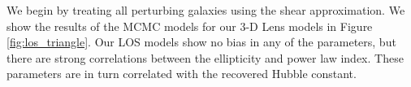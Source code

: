We begin by treating all perturbing galaxies using the shear approximation. We show the results of the MCMC models for our 3-D Lens models in Figure \ref{fig:los_triangle}. Our LOS models show no bias in any of the parameters, but there are strong correlations between the ellipticity and power law index. These parameters are in turn correlated with the recovered Hubble constant. 